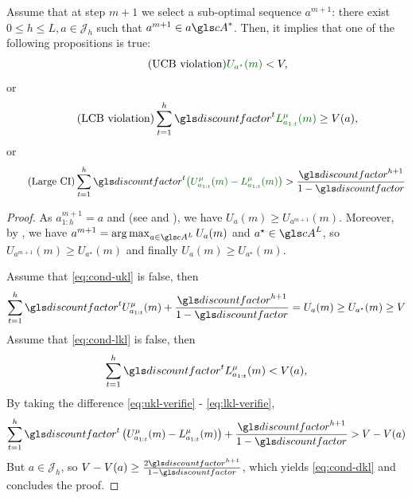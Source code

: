\begin{lemma}
	\label{lemma:sub-optimal-pull}
	\begin{leftbar}[lemmabar]
	Assume that at step $m+1$ we select a sub-optimal sequence $a^{m+1}$: there exist $0 \leq h \leq L,  a\in \mathcal{J}_h$ such that $a^{m+1} \in a\cA^{\ast}$. Then, it implies that one of the following propositions is true:
	\begin{equation}
	\label{eq:cond-ukl}
	\tag{UCB violation}
	\diff{U_{a^{\star}}(m)} < V,
	\end{equation}
	or
	\begin{equation}
	\tag{LCB violation}
	\label{eq:cond-lkl}
	\sum_{t=1}^h \discount^t \diff{L^{\mu}_{a_{1:t}}(m)} \geq V(a),
	\end{equation}
	or
	\begin{equation}
	\tag{Large CI}
	\label{eq:cond-dkl}
	\sum_{t=1}^h \discount^t\diff{\left(U^{\mu}_{a_{1:t}}(m) - L^{\mu}_{a_{1:t}}(m)\right)} > \frac{\discount^{h+1}}{1-\discount}
	\end{equation}
	\end{leftbar}
\end{lemma}
\begin{proof}
	As $a^{m+1}_{1:h} = a$ and  (see  and ), we have $U_a(m) \geq U_{a^{m+1}}(m)$. Moreover, by , we have $a^{m+1} = \argmax_{a \in \cA^L}  U_a(m)$ and $a^{\star}\in \cA^L$, so $U_{a^{m+1}}(m) \geq U_{a^{\star}}(m)$ and finally $U_a(m) \geq U_{a^{\star}}(m)$.
	
	Assume that \eqref{eq:cond-ukl} is false, then
	\begin{equation}
	\label{eq:ukl-verifie}
	\sum_{t=1}^h \discount^t U^{\mu}_{a_{1:t}}(m) + \frac{\discount^{h+1}}{1-\discount} = U_a(m) \geq U_{a^{\star}}(m) \geq V
	\end{equation}
	Assume that \eqref{eq:cond-lkl} is false, then
	\begin{equation}
	\label{eq:lkl-verifie}
	\sum_{t=1}^h \discount^t L^{\mu}_{a_{1:t}}(m) < V(a),
	\end{equation}
	By taking the difference \eqref{eq:ukl-verifie} - \eqref{eq:lkl-verifie}, 
	\begin{equation*}
	\sum_{t=1}^h \discount^t \left(U^{\mu}_{a_{1:t}}(m) - L^{\mu}_{a_{1:t}}(m)\right) + \frac{\discount^{h+1}}{1-\discount} > V - V(a)
	\end{equation*}
	But $a \in \mathcal{J}_h$, so $V - V(a) \geq \frac{2\discount^{h+1}}{1-\discount}$, which yields \eqref{eq:cond-dkl} and concludes the proof.
\end{proof}

